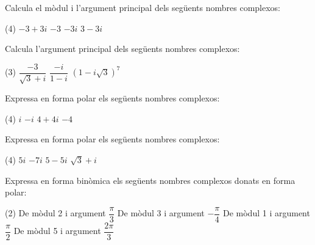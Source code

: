  
 \begin{mylist}
 	
	\exer  
	Calcula el mòdul i l'argument principal dels següents nombres
 	complexos:

	\begin{tasks}(4)
		\task  $-3+3i$
		\task  $-3$
		\task $-3i$
		\task $3-3i$
	\end{tasks}
\answers[cols=1]{[$|z|=\sqrt{18}$;  $arg(z)=135^\circ$,
	$|z|=3$;  $arg(z)=180^\circ$,
	$|z|=3$;  $arg(z)=270^\circ$,
	$|z|=\sqrt{18}$;  $arg(z)=-45^\circ$]}


\exer Calcula l'argument principal dels següents nombres
complexos:

\begin{tasks}(3)
	\task  $\dfrac{-3}{\sqrt{3} + i}$
	\task  $\dfrac{-i}{1-i}$
	\task  $(1-i\sqrt{3})^7$
\end{tasks}
 \answers{[$z=\frac{3}{4}(-\sqrt{3}+i)$; $arg(z)=150^\circ$,
		  $z=\frac{1}{2}(1-i)$; $arg(z)=-45^\circ$,
		  $z=\left[2_{-60^\circ}\right]^7$; $arg(z)=-420^\circ=-60^\circ$]}
 
	\exer
	Expressa en forma polar els següents nombres complexos:

	\begin{tasks}(4)
		\task $i$ 
		\task $-i$
		\task $4 + 4i$ 
		\task $-4$
	\end{tasks}

	
	\exer
	Expressa en forma polar els següents nombres complexos:

	\begin{tasks}(4)
		\task $5i$ 
		\task $-7i$
		\task $5 - 5i$ 
		\task $\sqrt{3}+i$

	\end{tasks}
	
	\exer[1] Expressa en forma binòmica els següents nombres complexos donats en forma polar:
	\begin{tasks}(2)
		\task De mòdul 2 i argument $\dfrac{\pi}{3}$
		\task De mòdul 3 i argument $-\dfrac{\pi}{4}$
		\task De mòdul 1 i argument $\dfrac{\pi}{2}$
		\task De mòdul 5 i argument $\dfrac{2 \pi}{3}$
	\end{tasks}
\answers[cols=1]{[ 
		 $2_{\,60^\circ}= 1 - \sqrt{3} i$, 
		 $3_{\,-45^\circ}= \frac{3\sqrt{2}}{2} - \frac{3\sqrt{2}}{2} i$, 
		 $1_{\,90^\circ}= i $, 
		 $5_{\,120^\circ}= -\frac{5}{2} + i \frac{5\sqrt{3}}{2}$]}
\end{mylist}
	
